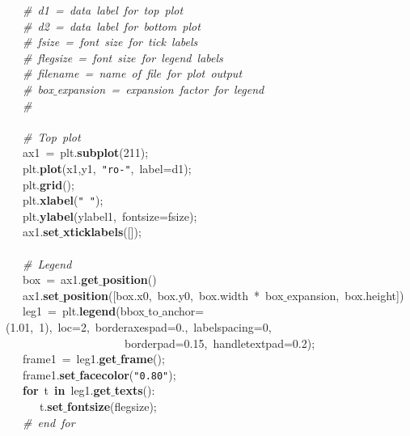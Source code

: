 \mbox{}\ \ \ \textit{\#\ d1\ =\ data\ label\ for\ top\ plot} \\
\mbox{}\ \ \ \textit{\#\ d2\ =\ data\ label\ for\ bottom\ plot} \\
\mbox{}\ \ \ \textit{\#\ fsize\ =\ font\ size\ for\ tick\ labels} \\
\mbox{}\ \ \ \textit{\#\ flegsize\ =\ font\ size\ for\ legend\ labels} \\
\mbox{}\ \ \ \textit{\#\ filename\ =\ name\ of\ file\ for\ plot\ output} \\
\mbox{}\ \ \ \textit{\#\ box$\_$expansion\ =\ expansion\ factor\ for\ legend} \\
\mbox{}\ \ \ \textit{\#} \\
\mbox{}\ \ \  \\
\mbox{}\ \ \ \textit{\#\ Top\ plot} \\
\mbox{}\ \ \ ax1\ =\ plt.\textbf{subplot}(211); \\
\mbox{}\ \ \ plt.\textbf{plot}(x1,y1,\ \texttt{"{}ro-"{}},\ label=d1); \\
\mbox{}\ \ \ plt.\textbf{grid}(); \\
\mbox{}\ \ \ plt.\textbf{xlabel}(\texttt{"{}\ "{}}); \\
\mbox{}\ \ \ plt.\textbf{ylabel}(ylabel1,\ fontsize=fsize); \\
\mbox{}\ \ \ ax1.\textbf{set$\_$xticklabels}([]); \\
\mbox{}\ \ \  \\
\mbox{}\ \ \ \textit{\#\ Legend} \\
\mbox{}\ \ \ box\ =\ ax1.\textbf{get$\_$position}() \\
\mbox{}\ \ \ ax1.\textbf{set$\_$position}([box.x0,\ box.y0,\ box.width\ *\ box$\_$expansion,\ box.height]) \\
\mbox{}\ \ \ leg1\ =\ plt.\textbf{legend}(bbox$\_$to$\_$anchor=(1.01,\ 1),\ loc=2,\ borderaxespad=0.,\ labelspacing=0,\  \\
\mbox{}\ \ \ \ \ \ \ \ \ \ \ \ \ \ \ \ \ \ \ \ \ borderpad=0.15,\ handletextpad=0.2); \\
\mbox{}\ \ \ frame1\ =\ leg1.\textbf{get$\_$frame}(); \\
\mbox{}\ \ \ frame1.\textbf{set$\_$facecolor}(\texttt{"{}0.80"{}}); \\
\mbox{}\ \ \ \textbf{for}\ t\ \textbf{in}\ leg1.\textbf{get$\_$texts}(): \\
\mbox{}\ \ \ \ \ \ t.\textbf{set$\_$fontsize}(flegsize); \\
\mbox{}\ \ \ \textit{\#\ end\ for} \\
